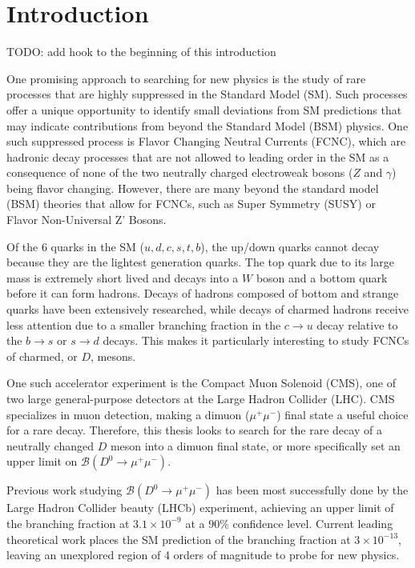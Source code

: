 \chapter{Introduction}

TODO: add hook to the beginning of this introduction

One promising approach to searching for new physics is the study of rare processes that are highly suppressed in the Standard Model (SM). Such processes offer a unique opportunity to identify small deviations from SM predictions that may indicate contributions from beyond the Standard Model (BSM) physics. One such suppressed process is Flavor Changing Neutral Currents (FCNC), which are hadronic decay processes that are not allowed to leading order in the SM as a consequence of none of the two neutrally charged electroweak bosons ($Z$ and $\gamma$) being flavor changing. However, there are many beyond the standard model (BSM) theories that allow for FCNCs, such as Super Symmetry (SUSY) or Flavor Non-Universal Z' Bosons.

Of the 6 quarks in the SM ($u,d,c,s,t,b$), the up/down quarks cannot decay because they are the lightest generation quarks. The top quark due to its large mass is extremely short lived and decays into a $W$ boson and a bottom quark before it can form hadrons. Decays of hadrons composed of bottom and strange quarks have been extensively researched, while decays of charmed hadrons receive less attention due to a smaller branching fraction in the $c \to u$ decay relative to the $b\to s$ or $s \to d$ decays. This makes it particularly interesting to study FCNCs of charmed, or $D$, mesons.

One such accelerator experiment is the Compact Muon Solenoid (CMS), one of two large general-purpose detectors at the Large Hadron Collider (LHC). CMS specializes in muon detection, making a dimuon ($\mu^+\mu^-$) final state a useful choice for a rare decay. Therefore, this thesis looks to search for the rare decay of a neutrally changed $D$ meson into a dimuon final state, or more specifically set an upper limit on $\mathcal{B}(D^0 \to \mu^+ \mu^-)$.

Previous work studying $\mathcal{B}(D^0 \to \mu^+ \mu^-)$ has been most successfully done by the Large Hadron Collider beauty (LHCb) experiment, achieving an upper limit of the branching fraction at $3.1\times 10^{-9}$ at a $90\%$ confidence level. Current leading theoretical work places the SM prediction of the branching fraction at $3\times 10^{-13}$, leaving an unexplored region of 4 orders of magnitude to probe for new physics.

